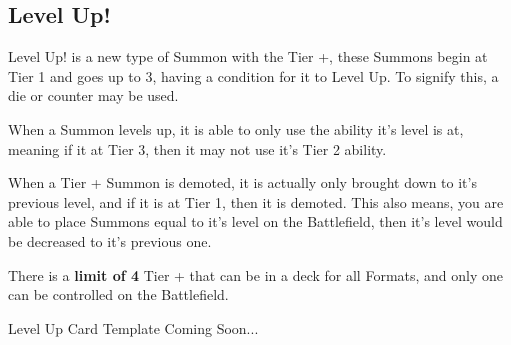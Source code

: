 \subsection{Level Up!}
Level Up! is a new type of Summon with the Tier +, these Summons begin at Tier 1 and goes up to 3, 
having a condition for it to Level Up. To signify this, a die or counter may be used.
\par When a Summon levels up, it is able to only use the ability it's level is at, meaning if it at 
Tier 3, then it may not use it's Tier 2 ability.
\par When a Tier + Summon is demoted, it is actually only brought down to it's previous 
level, and if it is at Tier 1, then it is demoted. This also means, you are able to place Summons equal to
it's level on the Battlefield, then it's level would be decreased to it's previous one. 
\par There is a \textbf{limit of 4} Tier + that can be in a deck for all Formats, and only one can be controlled
on the Battlefield.  

\par Level Up Card Template Coming Soon...

